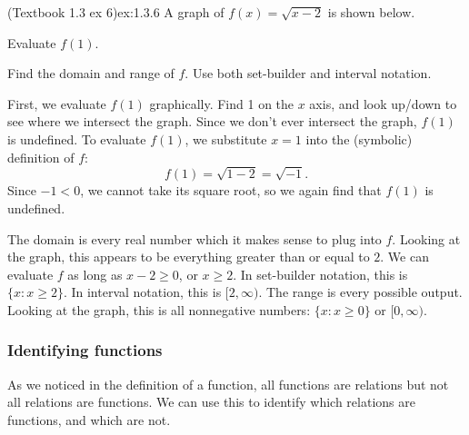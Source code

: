 \documentclass{article}
\begin{document}
\begin{example}{(Textbook 1.3 ex 6)}{ex:1.3.6}
    A graph of $f(x)=\sqrt{x-2}$ is shown below.
    \begin{problem}
        \item Evaluate $f(1)$.
        \item Find the domain and range of $f$. Use both set-builder and interval notation.
    \end{problem}
    \begin{center}\end{center}
\end{example}
\begin{solution}
    \begin{problem}
        \item First, we evaluate $f(1)$ graphically. Find 1 on the $x$ axis, and look up/down to see where we intersect the graph. Since we don't ever intersect the graph, $f(1)$ is undefined. To evaluate $f(1)$, we substitute $x=1$ into the (symbolic) definition of $f$:
            \[f(1)=\sqrt{1-2}=\sqrt{-1}.\]
            Since $-1<0$, we cannot take its square root, so we again find that $f(1)$ is undefined.
        \item The domain is every real number which it makes sense to plug into $f$. Looking at the graph, this appears to be everything greater than or equal to $2$. We can evaluate $f$ as long as $x-2\geq 0$, or $x\geq2$. In set-builder notation, this is $\{x:x\geq 2\}$. In interval notation, this is $[2,\infty)$.
            The range is every possible output. Looking at the graph, this is all nonnegative numbers: $\{x:x\geq 0\}$ or $[0,\infty)$.
    \end{problem}
\end{solution}


\subsubsection{Identifying functions}

As we noticed in the definition of a function, all functions are relations but not all relations are functions. We can use this to identify which relations are functions, and which are not.
\end{document}

